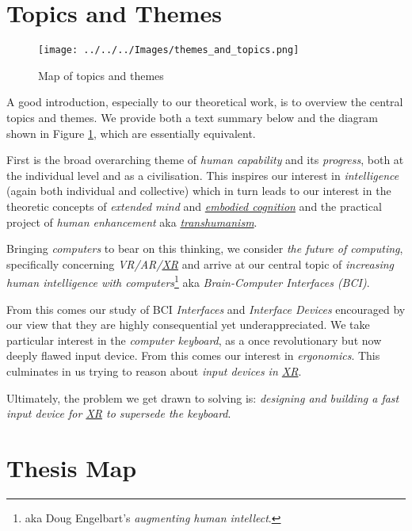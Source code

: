 \documentclass[logo,bsc,singlespacing,parskip]{infthesis}
\begin{document}
\chapter*{Topics and Themes}
\label{sec:org115fd4e}
\begin{figure}[h]
\centering
\texttt{[image: ../../../Images/themes\_and\_topics.png]}
\caption{\label{fig:topics_themes}Map of topics and themes}
\end{figure}

A good introduction, especially to our theoretical work, is to overview the central topics and themes.
We provide both a text summary below and the diagram shown in Figure \ref{fig:topics_themes}, which are essentially equivalent.

First is the broad overarching theme of \emph{human capability} and its \emph{progress}, both at the individual level and as a civilisation.
This inspires our interest in \emph{intelligence} (again both individual and collective) which in turn leads to our interest in
the theoretic concepts of \emph{extended mind} and \emph{\hyperref[org68031b0]{embodied cognition}} and the practical project of \emph{human enhancement} aka \emph{\hyperref[orgcf1996d]{transhumanism}}.

Bringing \emph{computers} to bear on this thinking, we consider \emph{the future of computing}, specifically concerning \emph{VR/AR/\hyperref[orgf7f8e78]{XR}} and arrive at our central topic of \emph{increasing human intelligence with computers}\footnote{aka Doug Engelbart's \emph{augmenting human intellect}.} aka \emph{Brain-Computer Interfaces (BCI)}.

From this comes our study of BCI \emph{Interfaces} and \emph{Interface Devices} encouraged by our view that they are highly consequential yet underappreciated.
We take particular interest in the \emph{computer keyboard}, as a once revolutionary but now deeply flawed input device.
From this comes our interest in \emph{ergonomics}.
This culminates in us trying to reason about \emph{input devices in \hyperref[orgf7f8e78]{XR}}.

Ultimately, the problem we get drawn to solving is: \emph{designing and building a fast input device for \hyperref[orgf7f8e78]{XR} to supersede the keyboard}.
\chapter*{Thesis Map}
\label{sec:orga187150}
\end{document}
